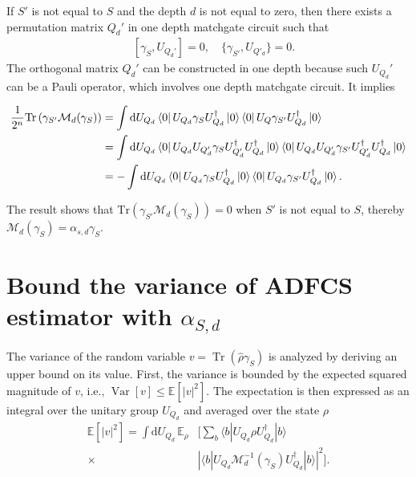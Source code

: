 \documentclass[showpacs,twocolumn,aps,prx,long bibliography,superscriptaddress,notitlepage]{revtex4-1}
\newcommand{\tra}[1]{\text{Tr}\left( #1 \right)}
\newcommand{\Var}{\mathop{\mathrm{Var}}}
\begin{document}
If $S'$ is not equal to $ S$ and the depth $d$ is not equal to zero, 
then there exists a permutation matrix $Q_d'$ in one depth matchgate circuit such that
\begin{align}
\quad [\gamma_{S}, U_{Q_d'}] = 0, \quad \{\gamma_{S'}, U_{Q'_d}\} = 0. 
\end{align}
The orthogonal matrix $Q_d'$ can be constructed in one depth because such $U_{Q_d}'$ can be a Pauli operator, which involves one depth matchgate circuit. It implies
\begin{widetext}
    \begin{align}
\frac{1}{2^n}\tra{\gamma_{S'} \mathcal{M}_d(\gamma_S)} &= 
\int \dd U_{Q_d} \bra{0} U_{Q_d} \gamma_S U_{Q_d}^\dagger \ket{0}\bra{0}U_Q \gamma_{S'} U_{Q_d}^\dagger\ket{0}\\
&=\int \dd U_{Q_d} \bra{0}U_{Q_d} U_{Q'_d} \gamma_S U_{Q'_d}^\dagger U_{Q_d}^\dagger\ket{0}\bra{0}U_{Q_d} U_{Q'_d}\gamma_{S'} U_{Q'_d}^\dagger U_{Q_d}^\dagger\ket{0}\\
&= -\int \dd U_{Q_d} \bra{0}U_{Q_d} \gamma_S U_{Q_d}^\dagger\ket{0}\bra{0}U_{Q_d} \gamma_{S'} U_{Q_d}^\dagger\ket{0}.
\end{align}
\end{widetext}

The result shows that $\tra{\gamma_{S'} \mathcal{M}_d(\gamma_S)} = 0$ when $S'$ is not equal to $ S$, thereby $\mathcal{M}_d (\gamma_S) = \alpha_{s,d} \gamma_S$.



\section{Bound the variance of ADFCS estimator with $\alpha_{S,d}$}
\label{appendix: bound variance}


The variance of the random variable $ v = \operatorname{Tr}(\hat{\rho} \gamma_S) $ is analyzed by deriving an upper bound on its value. First, the variance is bounded by the expected squared magnitude of $ v $, i.e., $ \Var[v] \leq \mathbb{E}[|v|^2] $. The expectation is then expressed as an integral over the unitary group $ U_{Q_d} $ and averaged over the state $ \rho $
\begin{equation}
\begin{aligned}
    \mathbb{E}[|v|^2] = \int \mathrm{d}U_{Q_d} \, \mathbb{E}_{\rho} & \Big[\sum_b \langle b|U_{Q_d} \rho U_{Q_d}^\dagger|b \rangle \\ 
     \times & \left|\langle b|U_{Q_d} \mathcal{M}_d^{-1}(\gamma_S) U_{Q_d}^\dagger|b \rangle\right|^2\Big].
\end{aligned}
\end{equation}
\end{document}
